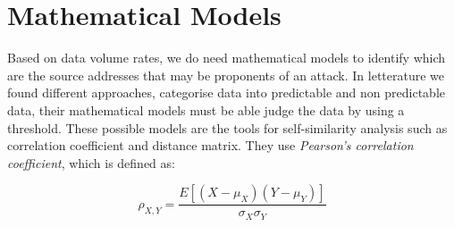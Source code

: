 \section{Mathematical Models}
\label{sec:mathmodel}
Based on data volume rates, we do need mathematical models to identify which are the source addresses that may be proponents of an attack. 
In letterature we found different approaches, \cite{detection_by_path_analaysis} categorise data into predictable and non predictable data, their mathematical models must be able judge the data by using a threshold. These possible models are the tools for self-similarity analysis such as correlation coefficient and distance matrix. They \cite{detection_by_path_analaysis} use \textit{Pearson's correlation coefficient}, which is defined as:

\begin{equation}
\label{eq:pearson_corr}
	\rho_{X, Y} = \frac{E[(X-\mu_{X})(Y-\mu_{Y})]}{\sigma_X\sigma_Y}
\end{equation}

